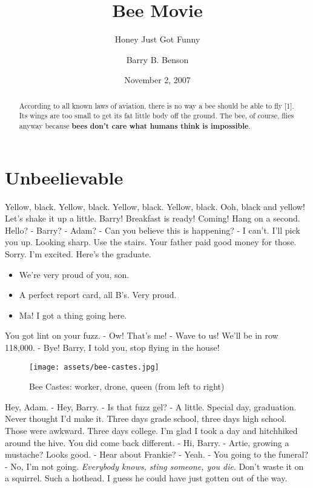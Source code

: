 \documentclass[
  letterpaper,
  twocolumn]{article}
\title{Bee Movie}
\subtitle{Honey Just Got Funny}
\author{Barry B. Benson}
\date{November 2, 2007}
\providecommand{\tightlist}{%
  \setlength{\itemsep}{0pt}\setlength{\parskip}{0pt}}
\begin{document}
\maketitle
\begin{abstract}
According to all known laws of aviation, there is no way a bee should be
able to fly {[}1{]}. Its wings are too small to get its fat little body
off the ground. The bee, of course, flies anyway because \textbf{bees
don't care what humans think is impossible}.
\end{abstract}

\hypertarget{unbeelievable}{%
\section{Unbeelievable}\label{unbeelievable}}

Yellow, black. Yellow, black. Yellow, black. Yellow, black. Ooh, black
and yellow! Let's shake it up a little. Barry! Breakfast is ready!
Coming! Hang on a second. Hello? - Barry? - Adam? - Can you believe this
is happening? - I can't. I'll pick you up. Looking sharp. Use the
stairs. Your father paid good money for those. Sorry. I'm excited.
Here's the graduate.

\begin{itemize}
\tightlist
\item
  We're very proud of you, son.
\item
  A perfect report card, all B's. Very proud.
\item
  Ma! I got a thing going here.
\end{itemize}

You got lint on your fuzz. - Ow! That's me! - Wave to us! We'll be in
row 118,000. - Bye! Barry, I told you, stop flying in the house!

\begin{figure}
\centering
\texttt{[image: assets/bee-castes.jpg]}
\caption{Bee Castes: worker, drone, queen (from left to right)}
\end{figure}

Hey, Adam. - Hey, Barry. - Is that fuzz gel? - A little. Special day,
graduation. Never thought I'd make it. Three days grade school, three
days high school. Those were awkward. Three days college. I'm glad I
took a day and hitchhiked around the hive. You did come back different.
- Hi, Barry. - Artie, growing a mustache? Looks good. - Hear about
Frankie? - Yeah. - You going to the funeral? - No, I'm not going.
\emph{Everybody knows, sting someone, you die}. Don't waste it on a
squirrel. Such a hothead. I guess he could have just gotten out of the
way.
\end{document}
